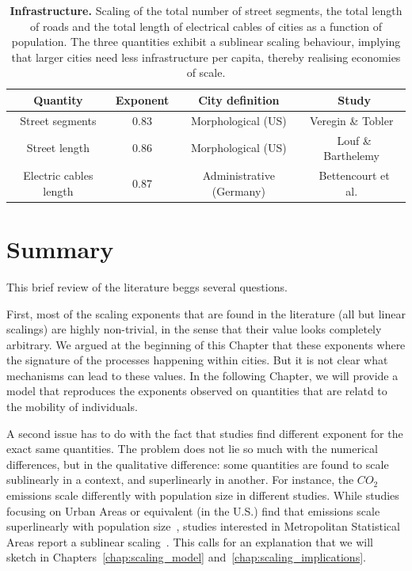 \begin{table}[!h]
    \centering
\begin{tabular}{|cccc|}
\hline
Quantity & Exponent & City definition & Study\\
\hline
Street segments & 0.83 & Morphological (US) & Veregin \& Tobler~\cite{Veregin:1997}\\
Street length & 0.86 & Morphological (US) & Louf \& Barthelemy~\cite{Louf:2014_scaling}\\
Electric cables length & 0.87 & Administrative (Germany) & Bettencourt et al.~\cite{Bettencourt:2007}\\
\hline
\end{tabular}
\caption{{\bf Infrastructure. } Scaling of the total number of street segments,
    the total length of roads and the total length of electrical cables of
    cities as a function of population. The three quantities exhibit a sublinear
    scaling behaviour, implying that larger cities need less infrastructure per
    capita, thereby realising economies of scale.\label{tab:infrastructure}
}
\end{table}

\section{Summary}
\label{sec:summary}


This brief review of the literature beggs several questions. 

First, most of the scaling exponents that are found in the literature (all but
linear scalings) are highly non-trivial, in the sense that their value looks
completely arbitrary. We argued at the beginning of this Chapter that these
exponents where the signature of the processes happening within cities. But it
is not clear what mechanisms can lead to these values. In the following Chapter,
we will provide a model that reproduces the exponents observed on quantities
that are relatd to the mobility of individuals.

A second issue has to do with the fact that studies find different exponent for
the exact same quantities. The problem does not lie so much with the numerical
differences, but in the qualitative difference: some quantities are found to
scale sublinearly in a context, and superlinearly in another. For instance, the
$CO_2$ emissions scale differently with population size in different studies.
While studies focusing on Urban Areas or equivalent (in the U.S.) find that
emissions scale superlinearly with population size~\cite{Louf:2014_scaling,
Oliveira:2014}, studies interested in Metropolitan Statistical Areas report a
sublinear scaling~\cite{Fragkias:2013}. This calls for an explanation that we
will sketch in Chapters~\ref{chap:scaling_model}
and~\ref{chap:scaling_implications}.
